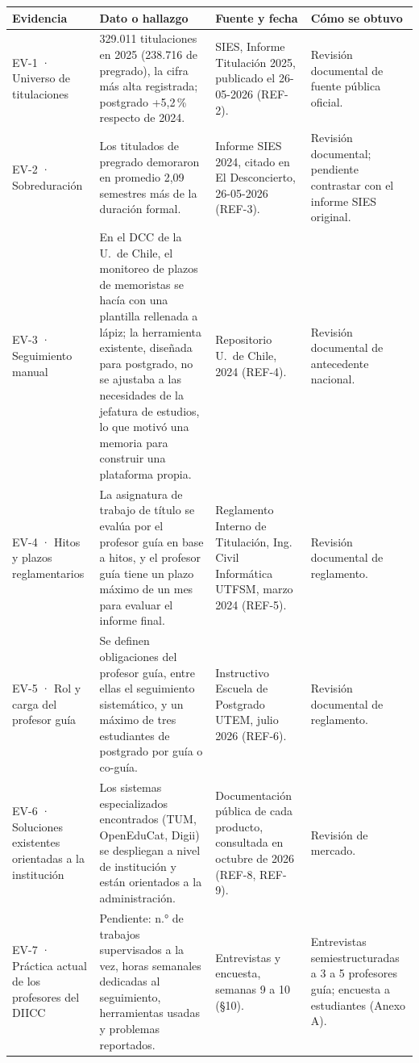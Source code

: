 \documentclass[10pt,a4paper]{article}
\newcommand{\hrow}{\rowcolor{encabezado}}
\newcommand{\h}[1]{\textbf{#1}}
\begin{document}
\begin{xltabular}{\linewidth}{|P{3.4cm}|L|P{3.6cm}|P{3.3cm}|}
\hline\hrow \h{Evidencia} & \h{Dato o hallazgo} & \h{Fuente y fecha} & \h{Cómo se obtuvo} \\ \hline
\endhead
EV-1 · Universo de titulaciones & 329.011 titulaciones en 2025 (238.716 de pregrado), la cifra más alta registrada; postgrado +5,2\,\% respecto de 2024. & SIES, Informe Titulación 2025, publicado el 26-05-2026 (REF-2). & Revisión documental de fuente pública oficial. \\ \hline
EV-2 · Sobreduración & Los titulados de pregrado demoraron en promedio 2,09 semestres más de la duración formal. & Informe SIES 2024, citado en El Desconcierto, 26-05-2026 (REF-3). & Revisión documental; pendiente contrastar con el informe SIES original. \\ \hline
EV-3 · Seguimiento manual & En el DCC de la U.~de Chile, el monitoreo de plazos de memoristas se hacía con una plantilla rellenada a lápiz; la herramienta existente, diseñada para postgrado, no se ajustaba a las necesidades de la jefatura de estudios, lo que motivó una memoria para construir una plataforma propia. & Repositorio U.~de Chile, 2024 (REF-4). & Revisión documental de antecedente nacional. \\ \hline
EV-4 · Hitos y plazos reglamentarios & La asignatura de trabajo de título se evalúa por el profesor guía en base a hitos, y el profesor guía tiene un plazo máximo de un mes para evaluar el informe final. & Reglamento Interno de Titulación, Ing. Civil Informática UTFSM, marzo 2024 (REF-5). & Revisión documental de reglamento. \\ \hline
EV-5 · Rol y carga del profesor guía & Se definen obligaciones del profesor guía, entre ellas el seguimiento sistemático, y un máximo de tres estudiantes de postgrado por guía o co-guía. & Instructivo Escuela de Postgrado UTEM, julio 2026 (REF-6). & Revisión documental de reglamento. \\ \hline
EV-6 · Soluciones existentes orientadas a la institución & Los sistemas especializados encontrados (TUM, OpenEduCat, Digii) se despliegan a nivel de institución y están orientados a la administración. & Documentación pública de cada producto, consultada en octubre de 2026 (REF-8, REF-9). & Revisión de mercado. \\ \hline

EV-7 · Práctica actual de los profesores del DIICC & Pendiente: n.° de trabajos supervisados a la vez, horas semanales dedicadas al seguimiento, herramientas usadas y problemas reportados. & Entrevistas y encuesta, semanas 9 a 10 (§10). & Entrevistas semiestructuradas a 3 a 5 profesores guía; encuesta a estudiantes (Anexo A).\\ \hline


\end{xltabular}
\end{document}
